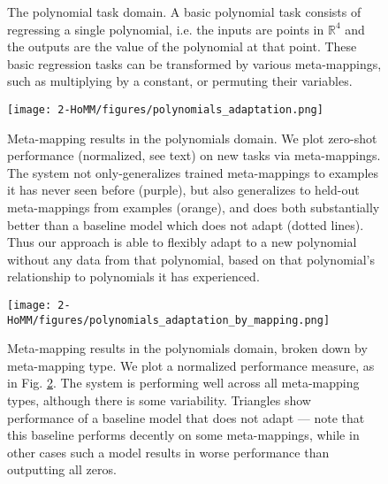 \begin{figure}[htbp]
\caption[The polynomial task domain.]{The polynomial task domain. A basic polynomial task consists of regressing a single polynomial, i.e. the inputs are points in \(\mathbb{R}^4\) and the outputs are the value of the polynomial at that point. These basic regression tasks can be transformed by various meta-mappings, such as multiplying by a constant, or permuting their variables. }\label{fig:HoMM_polynomials:tasks}
\end{figure}

\begin{figure}[htbp]
\centering
\texttt{[image: 2-HoMM/figures/polynomials\_adaptation.png]}
\caption[Meta-mapping results in the polynomials domain.]{Meta-mapping results in the polynomials domain. We plot zero-shot performance (normalized, see text) on new tasks via meta-mappings. The system not only-generalizes trained meta-mappings to examples it has never seen before (purple), but also generalizes to held-out meta-mappings from examples (orange), and does both substantially better than a baseline model which does not adapt (dotted lines). Thus our approach is able to flexibly adapt to a new polynomial without any data from that polynomial, based on that polynomial's relationship to polynomials it has experienced.}\label{fig:HoMM_polynomials:results}
\end{figure}

\begin{figure}[htbp]
\centering
\texttt{[image: 2-HoMM/figures/polynomials\_adaptation\_by\_mapping.png]}
\caption[Meta-mapping results in the polynomial domain, broken down by meta-mapping type.]{Meta-mapping results in the polynomials domain, broken down by meta-mapping type. We plot a normalized performance measure, as in Fig. \ref{fig:HoMM_polynomials:results}. The system is performing well across all meta-mapping types, although there is some variability. Triangles show performance of a baseline model that does not adapt --- note that this baseline performs decently on some meta-mappings, while in other cases such a model results in worse performance than outputting all zeros.} \label{fig:HoMM_polynomials:results_by_mapping}
\end{figure}

